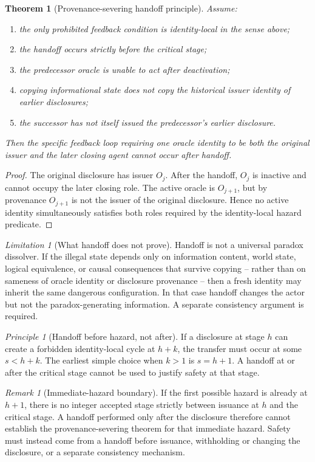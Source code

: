 \documentclass[11pt]{article}
\newtheorem{theorem}[definition]{Theorem}
\theoremstyle{remark}
\newtheorem{remark}[definition]{Remark}
\newtheorem{principle}[definition]{Principle}
\newtheorem{warning}[definition]{Limitation}
\begin{document}
\begin{theorem}[Provenance-severing handoff principle]
Assume:
\begin{enumerate}[label=(\roman*)]
\item the only prohibited feedback condition is identity-local in the sense above;
\item the handoff occurs strictly before the critical stage;
\item the predecessor oracle is unable to act after deactivation;
\item copying informational state does not copy the historical issuer identity of earlier disclosures;
\item the successor has not itself issued the predecessor's earlier disclosure.
\end{enumerate}
Then the specific feedback loop requiring one oracle identity to be both the original issuer and the later closing agent cannot occur after handoff.
\end{theorem}
\begin{proof}
The original disclosure has issuer $O_j$. After the handoff, $O_j$ is inactive and cannot occupy the later closing role. The active oracle is $O_{j+1}$, but by provenance $O_{j+1}$ is not the issuer of the original disclosure. Hence no active identity simultaneously satisfies both roles required by the identity-local hazard predicate.
\end{proof}

\begin{warning}[What handoff does not prove]
Handoff is not a universal paradox dissolver. If the illegal state depends only on information content, world state, logical equivalence, or causal consequences that survive copying -- rather than on sameness of oracle identity or disclosure provenance -- then a fresh identity may inherit the same dangerous configuration. In that case handoff changes the actor but not the paradox-generating information. A separate consistency argument is required.
\end{warning}

\begin{principle}[Handoff before hazard, not after]
If a disclosure at stage $h$ can create a forbidden identity-local cycle at $h+k$, the transfer must occur at some $s<h+k$. The earliest simple choice when $k>1$ is $s=h+1$. A handoff at or after the critical stage cannot be used to justify safety at that stage.
\end{principle}

\begin{remark}[Immediate-hazard boundary]
If the first possible hazard is already at $h+1$, there is no integer accepted stage strictly between issuance at $h$ and the critical stage. A handoff performed only after the disclosure therefore cannot establish the provenance-severing theorem for that immediate hazard. Safety must instead come from a handoff before issuance, withholding or changing the disclosure, or a separate consistency mechanism.
\end{remark}
\end{document}

